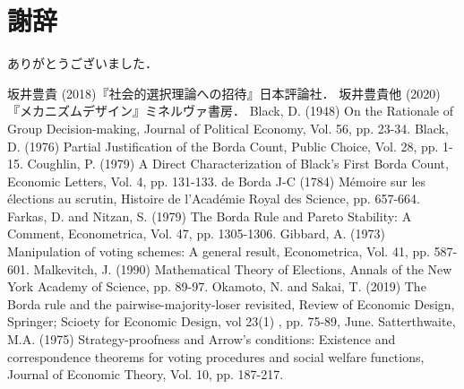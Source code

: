 \documentclass[dvipdfmx]{jsarticle}
\begin{document}
\section*{謝辞}
ありがとうございました．


\begin{thebibliography}{9}
  坂井豊貴 (2018)『社会的選択理論への招待』日本評論社．
  坂井豊貴他 (2020)『メカニズムデザイン』ミネルヴァ書房．
  Black, D. (1948) On the Rationale of Group Decision-making, Journal of Political Economy,
  Vol. 56, pp. 23-34.
  Black, D. (1976) Partial Justification of the Borda Count, Public Choice,
  Vol. 28, pp. 1-15.
  Coughlin, P. (1979) A Direct Characterization of Black's First Borda Count,
  Economic Letters, Vol. 4, pp. 131-133.
  de Borda J-C (1784) M\'{e}moire sur les \'{e}lections au scrutin, Histoire de l'Acad\'{e}mie
  Royal des Science, pp. 657-664.
  Farkas, D. and Nitzan, S. (1979) The Borda Rule and Pareto Stability: A Comment,
  Econometrica, Vol. 47, pp. 1305-1306.
  Gibbard, A. (1973) Manipulation of voting schemes: A general result, Econometrica, Vol. 41,
  pp. 587-601.
    Malkevitch, J. (1990) Mathematical Theory of Elections, Annals of the New York
    Academy of Science, pp. 89-97.
  Okamoto, N. and Sakai, T. (2019) The Borda rule and the pairwise-majority-loser
  revisited, Review of Economic Design, Springer; Scioety for Economic Design, vol 23(1)
  , pp. 75-89, June.
  Satterthwaite, M.A. (1975) Strategy-proofness and Arrow's conditions:
  Existence and correspondence theorems for voting procedures and social
  welfare functions, Journal of Economic Theory, Vol. 10, pp. 187-217.
\end{thebibliography}
\end{document}
